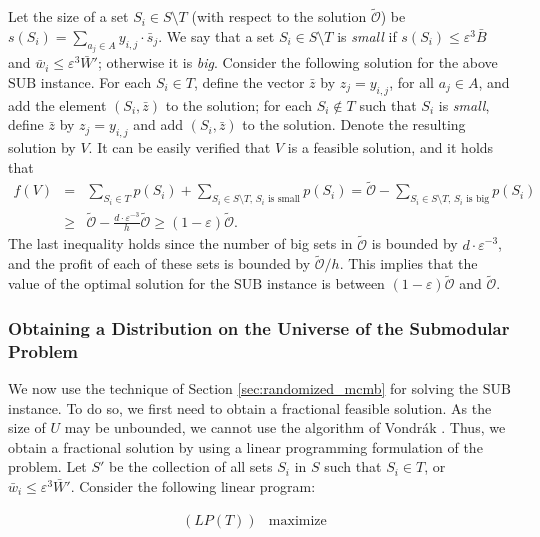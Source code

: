 \documentclass[11pt]{article}
\newcommand{\eps}{\varepsilon}
\newcommand{\bs}{\bar{s}}
\newcommand{\bz}{\bar{z}}
\newcommand{\bS}{S}
\newcommand{\bw}{\bar{w}}
\newcommand{\bW}{\bar{W}}
\newcommand{\bB}{\bar{B}}
\newcommand{\SUB}{\mbox{SUB}}
\newcommand{\tmO}{\tilde{\mathcal{O}}}
\begin{document}
{Let the size of a set
$S_i \in S \setminus T$
(with respect to the solution $\tmO$)
be $s(S_i) = \sum_{a_j \in A} y_{i,j} \cdot \bs_j$. We say that
a set $S_i \in \bS \setminus T$ is \emph{small} if
$s(S_i)\leq \eps^3 \bB$ and $\bw_i \leq \eps^3 \bW'$; otherwise it is
{\em big}.
Consider the following solution for the above ${\SUB}$ instance.
For each $S_i \in T$, define the vector $\bz$ by $z_j=y_{i,j}$,
for all $a_j \in A$, and add
the element $(S_i,\bz)$ to the solution; for each
$S_i \notin T$ such that $S_i$ is {\em small},
define $\bz$ by $z_j=y_{i,j}$ and add $(S_i,\bz)$ to the solution.
Denote the resulting solution by $V$.
It can be easily verified that $V$ is a feasible solution,
and it holds that
\begin{eqnarray}
f(V)&=& \sum_{S_i \in T} p(S_i) +
\sum_{S_i \in \bS \setminus T \mbox{, $S_i$ is small}} p(S_i) =
\tmO -
\sum_{S_i \in \bS \setminus T \mbox{, $S_i$ is big}} p(S_i)
\nonumber \\
&\geq& \tmO - \frac{d\cdot \eps ^{-3}}{h} \tmO \geq (1-\eps) \tmO.
\label{eq:lb_fV}
\end{eqnarray}
The last inequality holds since the number of big sets in $\tmO$
is bounded by $d \cdot \eps^{-3}$, and the profit of each of these
 sets is bounded by $\tmO /h$. This implies that the value of the optimal
solution for the $\SUB$ instance
 is between $(1-\eps) \tmO$ and $\tmO$.

\subsubsection{Obtaining a Distribution on the Universe of the Submodular
Problem}
We now use the technique of Section \ref{sec:randomized_mcmb}
for solving the $\SUB$ instance. To do so, we first need to obtain a fractional
feasible solution. As the size of $U$ may be unbounded, we cannot
use the algorithm of Vondr\'{a}k \cite{Vo08}. Thus, we obtain a fractional
solution by using
a linear programming formulation of the problem. Let $\bS'$
be the collection of all sets $S_i$ in $\bS$ such that $S_i \in T$,
or
${\bw}_i \leq \eps^3 \bW'$.
Consider the following linear program:


\[
\begin{array}{llll}
(LP(T))& \mbox{maximize} &


\end{array}\]}
\end{document}
